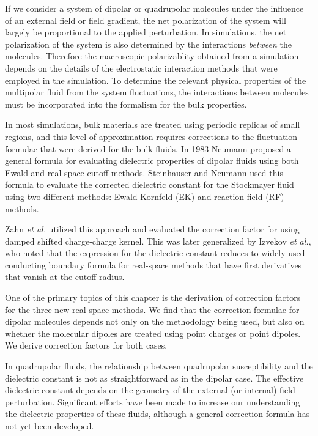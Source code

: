 If we consider a system of dipolar or quadrupolar molecules under the
influence of an external field or field gradient, the net polarization
of the system will largely be proportional to the applied
perturbation.\cite{Chitanvis96, Stern-Feller03, SalvchovI14,SalvchovII14} In simulations, the net polarization of the system is
also determined by the interactions \textit{between} the
molecules. Therefore the macroscopic polarizablity obtained from a
simulation depends on the details of the electrostatic interaction
methods that were employed in the simulation. To determine the
relevant physical properties of the multipolar fluid from the system
fluctuations, the interactions between molecules must be incorporated
into the formalism for the bulk properties.

In most simulations, bulk materials are treated using periodic
replicas of small regions, and this level of approximation requires
corrections to the fluctuation formulae that were derived for the bulk
fluids. In 1983 Neumann proposed a general formula for evaluating
dielectric properties of dipolar fluids using both Ewald and
real-space cutoff methods.\cite{NeumannI83} Steinhauser and Neumann
used this formula to evaluate the corrected dielectric constant for
the Stockmayer fluid using two different methods: Ewald-Kornfeld (EK)
and reaction field (RF) methods.\cite{NeumannII83}

Zahn \textit{et al.}\cite{Zahn02} utilized this approach and evaluated
the correction factor for using damped shifted charge-charge
kernel. This was later generalized by Izvekov \textit{et
  al.},\cite{Izvekov08} who noted that the expression for the
dielectric constant reduces to widely-used conducting boundary formula
for real-space methods that have first derivatives that vanish at the
cutoff radius.

One of the primary topics of this chapter is the derivation of
correction factors for the three new real space methods.  We find that
the correction formulae for dipolar molecules depends not only on the
methodology being used, but also on whether the molecular dipoles are
treated using point charges or point dipoles.  We derive correction
factors for both cases.

In quadrupolar fluids, the relationship between quadrupolar
susceptibility and the dielectric constant is not as straightforward
as in the dipolar case.  The effective dielectric constant depends on
the geometry of the external (or internal) field
perturbation.\cite{Ernst92} Significant efforts have been made to
increase our understanding the dielectric properties of these
fluids,\cite{JeonI03,JeonII03,Chitanvis96} although a general
correction formula has not yet been developed.

